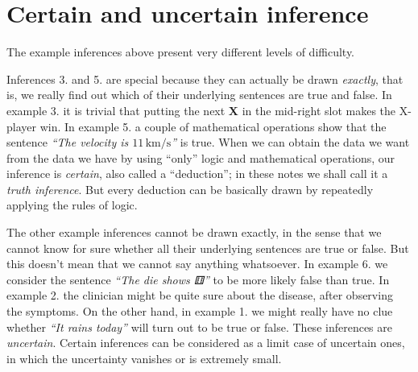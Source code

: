 \documentclass[
  letterpaper,
  DIV=11,
  numbers=noendperiod,
  oneside]{scrreprt}
\begin{document}

\hypertarget{certain-and-uncertain-inference}{%
\section{Certain and uncertain
inference}\label{certain-and-uncertain-inference}}

The example inferences above present very different levels of
difficulty.

Inferences 3. and 5. are special because they can actually be drawn
\emph{exactly}, that is, we really find out which of their underlying
sentences are true and false. In example 3. it is trivial that putting
the next {\textbf{X}} in the mid-right slot makes the X-player win. In
example 5. a couple of mathematical operations show that the sentence
\emph{``The velocity is \(11\,\mathrm{km/s}\)''} is true. When we can
obtain the data we want from the data we have by using
``only'' logic and mathematical operations,
our inference is \emph{certain}, also called a ``deduction''; in these
notes we shall call it a \emph{truth inference}. But every deduction can
be basically drawn by repeatedly applying the rules of logic.

The other example inferences cannot be drawn exactly, in the sense that
we cannot know for sure whether all their underlying sentences are true
or false. But this doesn't mean that we cannot say anything whatsoever.
In example 6. we consider the sentence \emph{``The die shows ⚅''} to be
more likely false than true. In example 2. the clinician might be quite
sure about the disease, after observing the symptoms. On the other hand,
in example 1. we might really have no clue whether \emph{``It rains
today''} will turn out to be true or false. These inferences are
\emph{uncertain}. Certain inferences can be considered as a limit case
of uncertain ones, in which the uncertainty vanishes or is extremely
small.
\end{document}
